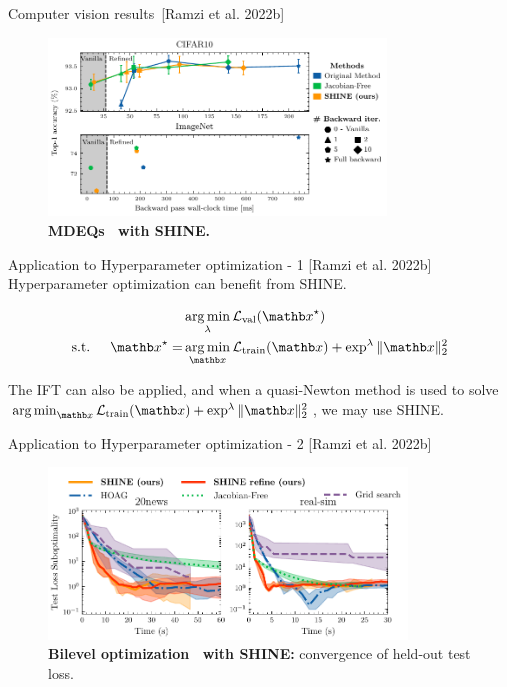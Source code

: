 \begin{frame}{Computer vision results~[Ramzi et al. 2022b]}
    \begin{figure}
        \centering
        \includegraphics[width=0.8\textwidth]{Figures/shine_figures/merged_results_latency_style.pdf}
        \caption{\textbf{MDEQs~\citep{Bai2020MultiscaleModels} with SHINE.}}
    \end{figure}
\end{frame}

\begin{frame}{Application to Hyperparameter optimization - 1 [Ramzi et al. 2022b]}
    Hyperparameter optimization can benefit from SHINE.

    \begin{equation*}
        \begin{split}
            &\argmin_{\lambda} \mathcal{L}_{\text{val}}(\xb^\star)\\
            \text{s.t. } \quad \xb^\star = &\argmin_{\xb} \mathcal{L}_{\text{train}}(\xb) + \exp^{\lambda} \|\xb\|_2^2
        \end{split}
    \end{equation*}

    \pause
    The IFT can also be applied, and when a quasi-Newton method is used to solve $\argmin_{\xb} \mathcal{L}_{\text{train}}(\xb) + \exp^{\lambda} \|\xb\|_2^2$, we may use SHINE.
\end{frame}

\begin{frame}{Application to Hyperparameter optimization - 2 [Ramzi et al. 2022b]}
    \begin{figure}
        \centering
        \includegraphics[width=0.85\textwidth]{Figures/shine_figures/bilevel_test.pdf}
        \caption{\textbf{Bilevel optimization~\citep{Pedregosa2016HyperparameterGradient} with SHINE:} convergence of held-out test loss.}
    \end{figure}

\end{frame}

